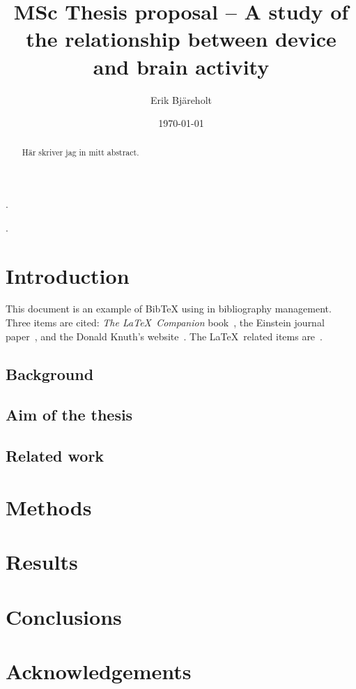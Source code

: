 \documentclass[a4paper]{article}   %
\title{MSc Thesis proposal -- A study of the relationship between device and brain activity}
\author{Erik Bjäreholt}
\date{\today}
\begin{document}
\maketitle

\begin{abstract}
Här skriver jag in mitt abstract.
\end{abstract}

\pagebreak.\pagebreak

\tableofcontents

\pagebreak.\pagebreak



\section{Introduction}

This document is an example of BibTeX using in bibliography management. Three items
are cited: \textit{The \LaTeX\ Companion} book~\cite{latexcompanion}, the Einstein
journal paper~\cite{einstein}, and the Donald Knuth's website~\cite{knuthwebsite}.
The \LaTeX\ related items are~\cite{latexcompanion,knuthwebsite}.

\nocite{*}


\subsection{Background}

\subsection{Aim of the thesis}

\subsection{Related work}

\section{Methods}

\section{Results}

\section{Conclusions}

\section*{Acknowledgements}
\end{document}
